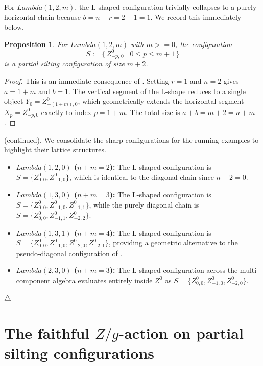 \documentclass[11pt, a4paper]{article}
\newtheorem{proposition}[theorem]{Proposition}
\theoremstyle{definition}
\def\Lambda{Lambda}%
\def\ge{>=}%
\def\mathbb#1{#1}%
\def\mathcal#1{#1}%
\begin{document}
For $\Lambda(1,2,m)$, the L-shaped configuration trivially collapses to a purely horizontal chain because $b = n-r = 2-1 = 1$. We record this immediately below.

\begin{proposition}\label{prop:12m}
For $\Lambda(1,2,m)$ with $m \ge 0$, the configuration
\[
  S := \bigl\{\, Z_{-p,\, 0}^0 \;\big|\; 0 \le p \le m+1 \,\bigr\}
\]
is a partial silting configuration of size $m+2$.
\end{proposition}

\begin{proof}
This is an immediate consequence of . Setting $r=1$ and $n=2$ gives $a = 1+m$ and $b = 1$. The vertical segment of the L-shape reduces to a single object $Y_0 = Z_{-(1+m), 0}^0$, which geometrically extends the horizontal segment $X_p = Z_{-p, 0}^0$ exactly to index $p = 1+m$. The total size is $a+b = m+2 = n+m$.
\end{proof}

 (continued). We consolidate the sharp configurations for the running examples to highlight their lattice structures.
\begin{itemize}
    \item \textbf{$\Lambda(1,2,0)$ ($n+m=2$):} The L-shaped configuration is $S = \{Z_{0,0}^0, Z_{-1,0}^0\}$, which is identical to the diagonal chain since $n-2 = 0$.
    \item \textbf{$\Lambda(1,3,0)$ ($n+m=3$):} The L-shaped configuration is $S = \{Z_{0,0}^0, Z_{-1,0}^0, Z_{-1,1}^0\}$, while the purely diagonal chain is $S = \{Z_{0,0}^0, Z_{-1,1}^0, Z_{-2,2}^0\}$.
    \item \textbf{$\Lambda(1,3,1)$ ($n+m=4$):} The L-shaped configuration is $S = \{Z_{0,0}^0, Z_{-1,0}^0, Z_{-2,0}^0, Z_{-2,1}^0\}$, providing a geometric alternative to the pseudo-diagonal configuration of .
    \item \textbf{$\Lambda(2,3,0)$ ($n+m=3$):} The L-shaped configuration across the multi-component algebra evaluates entirely inside $\mathcal Z^0$ as $S = \{Z_{0,0}^0, Z_{-1,0}^0, Z_{-2,0}^0\}$.
\end{itemize} \hfill $\triangle$


\section{The faithful \texorpdfstring{$\mathbb{Z}/g$}{Z/g}-action on partial silting configurations}\label{sec:Taction}
\end{document}
